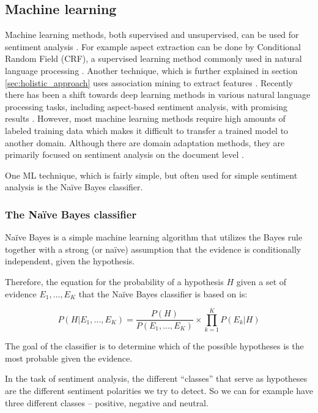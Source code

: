 \subsection{Machine learning}
Machine learning methods, both supervised and unsupervised, can be used for sentiment analysis \cite{liu_2015}. For example aspect extraction can be done by Conditional Random Field (CRF), a supervised learning method commonly used in natural language processing \cite{schouten_2016}. Another technique, which is further explained in section \ref{sec:holistic_approach} uses association mining to extract features \cite{hu_liu_2015}. Recently there has been a shift towards deep learning methods in various natural language processing tasks, including aspect-based sentiment analysis, with promising results \cite{Kumar2020,bing_dl_survey}.
However, most machine learning methods require high amounts of labeled training data which makes it difficult to transfer a trained model to another domain. Although there are domain adaptation methods, they are primarily focused on sentiment analysis on the document level \cite{liu_2015}. 


One ML technique, which is fairly simple, but often used for simple sentiment analysis is the Na\"ive Bayes classifier.
 

   
\subsubsection{The Na\"ive Bayes classifier}
\label{sec:NBC}
 Na\"ive Bayes is a simple machine learning algorithm that utilizes the Bayes rule together with a strong (or na\"ive) assumption that the evidence is conditionally independent, given the hypothesis. \cite{NB}

Therefore, the equation for the probability of a hypothesis $H$ given a set of evidence \linebreak $E_{1},\ldots,E_{K}$ that the Na\"ive Bayes classifier is based on is:

\begin{equation} 
P\left(H|E_{1},\ldots,E_{K}\right)=\frac{P(H)}{P(E_{1},\ldots,E_{K})}\times\prod_{k=1}^{K}P\left(E_{k}|H\right)
\end{equation}


The goal of the classifier is to determine which of the possible hypotheses is the most probable given the evidence.

In the task of sentiment analysis, the different ``classes'' that serve as hypotheses are the different sentiment polarities we try to detect. So we can for example have three different classes -- positive, negative and neutral.


